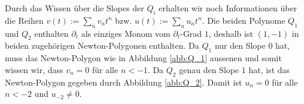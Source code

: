 Durch das Wissen über die Slopes der $Q_i$ erhalten wir noch Informationen über
die Reihen $v(t):=\sum_n v_nt^n$ bzw. $u(t):=\sum_n u_nt^n$. Die beiden
Polynome $Q_1$ und $Q_2$ enthalten $\partial_t$ als einziges Monom vom
$\partial_t$-Grad $1$, deshalb ist $(1,-1)$ in beiden zugehörigen
Newton-Polygonen enthalten.
Da $Q_1$ nur den Slope $0$ hat, muss das Newton-Polygon wie in Abbildung
\ref{abb:Q_1} aussenen und somit wissen wir, dass $v_n=0$ für alle $n<-1$.
Da $Q_2$ genau den Slope $1$ hat, ist das Newton-Polygon gegeben durch
Abbildung \ref{abb:Q_2}. Damit ist $u_n=0$ für alle $n<-2$ und $u_{-2}\neq0$.
\begin{figure}[htbp]
\end{figure}

